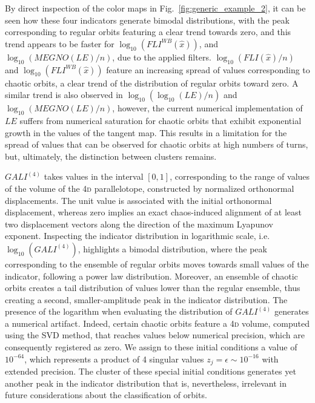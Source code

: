 \begin{chapterappendices}
By direct inspection of the color maps in Fig.~\ref{fig:generic_example_2}, it can be seen how these four indicators generate bimodal distributions, with the peak corresponding to regular orbits featuring a clear trend towards zero, and this trend appears to be faster for $\log_{10}(FLI^{WB}(\hat{x}))$, and $\log_{10}(MEGNO(LE)/n)$, due to the applied filters. $\log_{10}(FLI(\hat{x})/n)$ and $\log_{10}(FLI^{WB}(\hat{x}))$ feature an increasing spread of values corresponding to chaotic orbits, a clear trend of the distribution of regular orbits toward zero. A similar trend is also observed in $\log_{10}(\log_{10}(LE)/n)$ and $\log_{10}(MEGNO(LE)/n)$, however, the current numerical implementation of $LE$ suffers from numerical saturation for chaotic orbits that exhibit exponential growth in the values of the tangent map. This results in a limitation for the spread of values that can be observed for chaotic orbits at high numbers of turns, but, ultimately, the distinction between clusters remains. 

$GALI^{(4)}$ takes values in the interval $[0,1]$, corresponding to the range of values of the volume of the 4\textsc{d} parallelotope, constructed by normalized orthonormal displacements. The unit value is associated with the initial orthonormal displacement, whereas zero implies an exact chaos-induced alignment of at least two displacement vectors along the direction of the maximum Lyapunov exponent. Inspecting the indicator distribution in logarithmic scale, i.e.~$\log_{10}(GALI^{(4)})$, highlights a bimodal distribution, where the peak corresponding to the ensemble of regular orbits moves towards small values of the indicator, following a power law distribution. Moreover, an ensemble of chaotic orbits creates a tail distribution of values lower than the regular ensemble, thus creating a second, smaller-amplitude peak in the indicator distribution. The presence of the logarithm when evaluating the distribution of $GALI^{(4)}$ generates a numerical artifact. Indeed, certain chaotic orbits feature a 4\textsc{d} volume, computed using the SVD method, that reaches values below numerical precision, which are consequently registered as zero. We assign to these initial conditions a value of $10^{-64}$, which represents a product of 4 singular values $z_j=\epsilon\sim10^{-16}$ with extended precision. The cluster of these special initial conditions generates yet another peak in the indicator distribution that is, nevertheless, irrelevant in future considerations about the classification of orbits. 


\end{chapterappendices}
